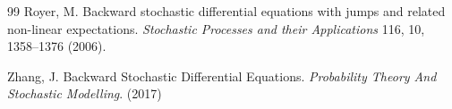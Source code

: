 \documentclass[11pt,a4paper]{article}
\numberwithin{equation}{section}
\theoremstyle{newPlain}
\theoremstyle{newDefinition}
\theoremstyle{newRemark}
\begin{document}
\begin{thebibliography}{99}
Royer, M.
Backward stochastic differential equations with jumps and related non-linear expectations.
\textit{Stochastic Processes and their Applications}
116, 10, 1358–1376 (2006).



Zhang, J. Backward Stochastic Differential Equations. {\em Probability Theory And Stochastic Modelling}. (2017)
















\end{thebibliography}
\end{document}
